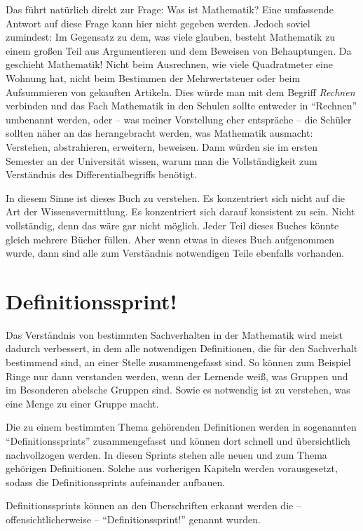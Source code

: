 Das führt natürlich direkt zur Frage: Was ist Mathematik? Eine umfassende Antwort auf diese Frage kann hier nicht gegeben werden. Jedoch soviel zumindest: Im Gegensatz zu dem, was viele glauben, besteht Mathematik zu einem großen Teil aus Argumentieren und dem Beweisen von Behauptungen. Da geschieht Mathematik! Nicht beim Ausrechnen, wie viele Quadratmeter eine Wohnung hat, nicht beim Bestimmen der Mehrwertsteuer oder beim Aufsummieren von gekauften Artikeln. Dies würde man mit dem Begriff \textsl{Rechnen} verbinden und das Fach Mathematik in den Schulen sollte entweder in "`Rechnen"' umbenannt werden, oder -- was meiner Vorstellung eher entspräche -- die Schüler sollten näher an das herangebracht werden, was Mathematik ausmacht: Verstehen, abstrahieren, erweitern, beweisen. Dann würden sie im ersten Semester an der Universität wissen, warum man die Vollständigkeit zum Verständnis des Differentialbegriffs benötigt. 

In diesem Sinne ist dieses Buch zu verstehen. Es konzentriert sich nicht auf die Art der Wissensvermittlung. Es konzentriert sich darauf konsistent zu sein. Nicht vollständig, denn das wäre gar nicht möglich. Jeder Teil dieses Buches könnte gleich mehrere Bücher füllen. Aber wenn etwas in dieses Buch aufgenommen wurde, dann sind alle zum Verständnis notwendigen Teile ebenfalls vorhanden.


\section{Definitionssprint!}

Das Verständnis von bestimmten Sachverhalten in der Mathematik wird meist dadurch verbessert, in dem alle notwendigen Definitionen, die für den Sachverhalt bestimmend sind, an einer Stelle zusammengefasst sind. So können zum Beispiel Ringe nur dann verstanden werden, wenn der Lernende weiß, was Gruppen und im Besonderen abelsche Gruppen sind. Sowie es notwendig ist zu verstehen, was eine Menge zu einer Gruppe macht. 

Die zu einem bestimmten Thema gehörenden Definitionen werden in sogenannten "`Definitionssprints"' zusammengefasst und können dort schnell und übersichtlich nachvollzogen werden. In diesen Sprints stehen alle neuen und zum Thema gehörigen Definitionen. Solche aus vorherigen Kapiteln werden vorausgesetzt, sodass die Definitionssprints aufeinander aufbauen.

Definitionssprints können an den Überschriften erkannt werden die -- offensichtlicherweise -- "`Definitionssprint!"' genannt wurden.

